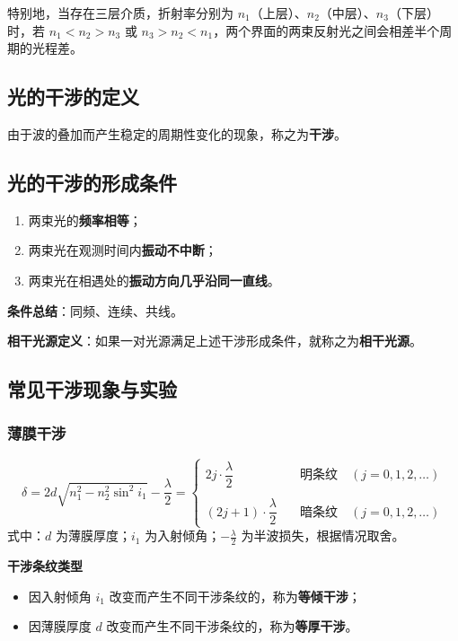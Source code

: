 \documentclass{article}
\begin{document}
	特别地，当存在三层介质，折射率分别为 $n_1$（上层）、$n_2$（中层）、$n_3$（下层）时，若 $n_1<n_2>n_3$ 或 $n_3>n_2<n_1$，两个界面的两束反射光之间会相差半个周期的光程差。
	
	\subsection{光的干涉的定义}
	由于波的叠加而产生稳定的周期性变化的现象，称之为\textbf{干涉}。
	
	\subsection{光的干涉的形成条件}
	\begin{enumerate}[label=\arabic*., leftmargin=2em]
		\item 两束光的\textbf{频率相等}；
		\item 两束光在观测时间内\textbf{振动不中断}；
		\item 两束光在相遇处的\textbf{振动方向几乎沿同一直线}。
	\end{enumerate}
	
	\textbf{条件总结}：同频、连续、共线。
	
	\textbf{相干光源定义}：如果一对光源满足上述干涉形成条件，就称之为\textbf{相干光源}。
	
	\subsection{常见干涉现象与实验}
	\subsubsection{薄膜干涉}
	\[
	\delta = 2d\sqrt{n_1^2-n_2^2\sin^2i_1} - \frac{\lambda}{2}=\begin{cases}
		2j\cdot\dfrac{\lambda}{2} \quad &\text{明条纹} \quad (j=0,1,2,\dots) \\
		\\
		(2j+1)\cdot\dfrac{\lambda}{2} \quad &\text{暗条纹} \quad (j=0,1,2,\dots)
	\end{cases}
	\]
	式中：$d$ 为薄膜厚度；$i_1$ 为入射倾角；$-\frac{\lambda}{2}$ 为半波损失，根据情况取舍。
	
	\textbf{干涉条纹类型}
	\begin{itemize}[leftmargin=2em]
		\item 因入射倾角 $i_1$ 改变而产生不同干涉条纹的，称为\textbf{等倾干涉}；
		\item 因薄膜厚度 $d$ 改变而产生不同干涉条纹的，称为\textbf{等厚干涉}。
	\end{itemize}
	
\end{document}
